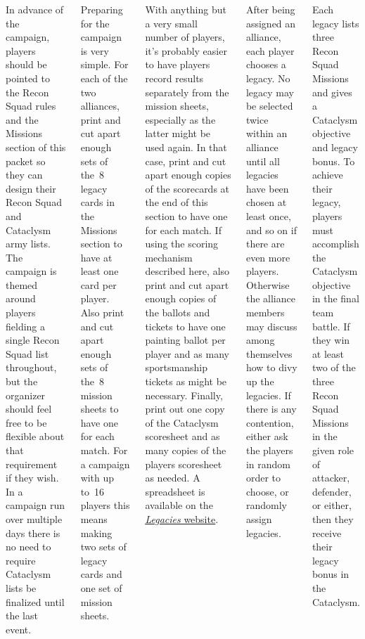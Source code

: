 \begin{columns}
In advance of the campaign, players should be pointed to the Recon
Squad rules and the Missions section of this packet so they can design
their Recon Squad and Cataclysm army lists.  The campaign is themed
around players fielding a single Recon Squad list throughout, but the
organizer should feel free to be flexible about that requirement if
they wish.  In a campaign run over multiple days there is no need to
require Cataclysm lists be finalized until the last event.

Preparing for the campaign is very simple.  For each of the two
alliances, print and cut apart enough sets of the~8 legacy cards in
the Missions section to have at least one card per player.
Also print and cut apart enough sets of the~8 mission sheets to have
one for each match.  For a campaign with up to~16 players this means
making two sets of legacy cards and one set of mission sheets.

With anything but a very small number of players, it's probably easier
to have players record results separately from the mission sheets,
especially as the latter might be used again.  In that case, print and
cut apart enough copies of the scorecards at the end of this section
to have one for each match.  If using the scoring mechanism described
here, also print and cut apart enough copies of the ballots and
tickets to have one painting ballot per player and as many
sportsmanship tickets as might be necessary. Finally, print out one
copy of the Cataclysm scoresheet and as many copies of the players
scoresheet as needed.  A spreadsheet is available on the
\underline{\href{http://rocketshipgames.com/40k/legacies/}{\emph{Legacies}
    website}}.


After being assigned an alliance, each player chooses a legacy.  No
legacy may be selected twice within an alliance until all legacies
have been chosen at least once, and so on if there are even more
players.  Otherwise the alliance members may discuss among themselves
how to divy up the legacies.  If there is any contention, either ask
the players in random order to choose, or randomly assign legacies.

Each legacy lists three Recon Squad Missions and gives a Cataclysm
objective and legacy bonus.  To achieve their legacy, players must
accomplish the Cataclysm objective in the final team battle.  If they
win at least two of the three Recon Squad Missions in the given role
of attacker, defender, or either, then they receive their legacy bonus
in the Cataclysm.


\end{columns}
